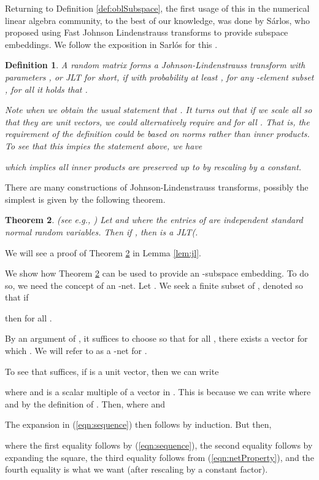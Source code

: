\documentclass[11pt]{article}
\newtheorem{theorem}{Theorem}
\newtheorem{definition}[theorem]{Definition}
\begin{document}
Returning to Definition \ref{def:oblSubspace}, the first usage of this in the numerical linear 
algebra community,
to the best of our knowledge, was done by S\'arlos, who proposed using Fast Johnson Lindenstrauss transforms
to provide subspace embeddings. We follow the exposition in Sarl\'{o}s for this \cite{S06}.

\begin{definition}
A random matrix  forms a Johnson-Lindenstrauss transform with parameters 
, or JLT for short, if with probability at least ,
for any -element subset , for all  it holds that
. 

Note when  
we obtain the usual statement that . It turns out that if we scale all  so that they are unit vectors, we could alternatively require 
 and  for all . That is, the requirement of the definition could be based on norms rather than inner products. To see that this
impies the statement above, we have 

which implies all inner products are preserved up to  by rescaling  by a constant. 
\end{definition}

There are many constructions of Johnson-Lindenstrauss transforms, possibly the simplest is given by
the following theorem. 

\begin{theorem}\label{thm:normals} (see e.g., \cite{IM98})
Let  and 
 where the entries
 of  are independent standard normal random variables. 
Then if ,
then  is a JLT(. 
\end{theorem}
We will see a proof of Theorem \ref{thm:normals} in Lemma \ref{lem:jl}. 

We show how Theorem \ref{thm:normals} can be used to provide an -subspace embedding. To do so, we need
the concept of an -net. Let 
.
We seek a finite subset of
, denoted  so that if 

then  for all . 

By an argument of \cite{AHK06,fo05,m07}, it suffices to choose  
so that for all , 
there exists a vector  for which . We will refer to 
as a -net for . 

To see that  suffices, if  is a unit
vector, then we can write 

where  and  is a scalar multiple of a vector in . This is
because we can write  where  and 
 by the definition of . 
Then,  where  and 

The expansion in (\ref{eqn:sequence}) then follows by induction. But then, 

where the first equality follows by (\ref{eqn:sequence}), the second equality follows by expanding the
square, the third equality follows from (\ref{eqn:netProperty}), and the fourth equality is what we want
(after rescaling  by a constant factor). 
\end{document}
